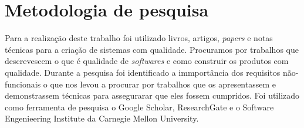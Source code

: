 \chapter{Metodologia de pesquisa}
Para a realização deste trabalho foi utilizado livros, artigos, \textit{papers}
e notas técnicas para a criação de sistemas com qualidade. Procuramos por trabalhos
que descrevescem o que é qualidade de \textit{softwares} e como construir os
produtos com qualidade. Durante a pesquisa foi identificado a immportância dos
requisitos não-funcionais o que nos levou a procurar por trabalhos que os
apresentassem e demonstrassem técnicas para assegurarar que eles fossem
cumpridos. \newline
Foi utilizado como ferramenta de pesquisa o Google Scholar, ResearchGate e o
Software Engenieering Institute da Carnegie Mellon University.
